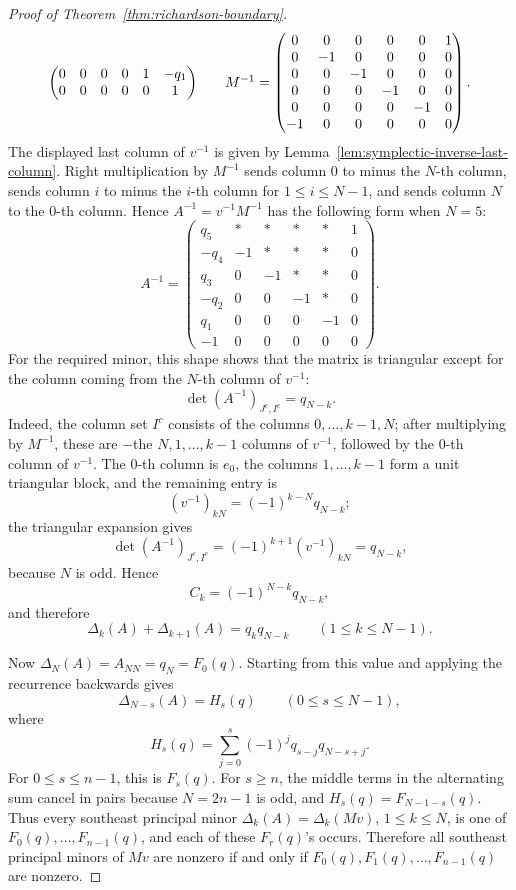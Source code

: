 \documentclass[10pt,a4paper]{amsart}
\begin{document}
\begin{proof}[Proof of Theorem~\ref{thm:richardson-boundary}]
\[\begin{array}{c@{\qquad}c}
\begin{pmatrix}
0&0&0&0&1&-q_1\\
0&0&0&0&0&1
\end{pmatrix}
&
M^{-1}=
\begin{pmatrix}
0&0&0&0&0&1\\
0&-1&0&0&0&0\\
0&0&-1&0&0&0\\
0&0&0&-1&0&0\\
0&0&0&0&-1&0\\
-1&0&0&0&0&0
\end{pmatrix}.
\end{array}
\]
The displayed last column of \(v^{-1}\) is given by Lemma~\ref{lem:symplectic-inverse-last-column}.
Right multiplication by \(M^{-1}\) sends column \(0\) to minus the \(N\)-th column, sends column \(i\) to minus the \(i\)-th column for \(1\le i\le N-1\), and sends column \(N\) to the \(0\)-th column. Hence \(A^{-1}=v^{-1}M^{-1}\) has the following form when \(N=5\):
\[
A^{-1}=
\begin{pmatrix}
q_5&*&*&*&*&1\\
-q_4&-1&*&*&*&0\\
q_3&0&-1&*&*&0\\
-q_2&0&0&-1&*&0\\
q_1&0&0&0&-1&0\\
-1&0&0&0&0&0
\end{pmatrix}.
\]
For the required minor, this shape shows that the matrix is triangular except for the column coming from the \(N\)-th column of \(v^{-1}\):
\[
\det(A^{-1})_{J^c,I^c}=q_{N-k}.
\]
Indeed, the column set \(I^c\) consists of the columns \(0,\ldots,k-1,N\); after multiplying by \(M^{-1}\), these are \(-\)the \(N,1,\ldots,k-1\) columns of \(v^{-1}\), followed by the \(0\)-th column of \(v^{-1}\). The \(0\)-th column is \(e_0\), the columns \(1,\ldots,k-1\) form a unit triangular block, and the remaining entry is
\[
(v^{-1})_{kN}=(-1)^{k-N}q_{N-k};
\]
the triangular expansion gives
\[
\det(A^{-1})_{J^c,I^c}
=(-1)^{k+1}(v^{-1})_{kN}
=q_{N-k},
\]
because \(N\) is odd. Hence
\[
C_k=(-1)^{N-k}q_{N-k},
\]
and therefore
\[
\Delta_k(A)+\Delta_{k+1}(A)=q_kq_{N-k}
\qquad(1\le k\le N-1).
\]

Now \(\Delta_N(A)=A_{NN}=q_N=F_0(q)\). Starting from this value and applying the recurrence backwards gives
\[
\Delta_{N-s}(A)=H_s(q)
\qquad(0\le s\le N-1),
\]
where
\[
H_s(q)=\sum_{j=0}^s(-1)^jq_{s-j}q_{N-s+j}.
\]
For \(0\le s\le n-1\), this is \(F_s(q)\). For \(s\ge n\), the middle terms in the alternating sum cancel in pairs because \(N=2n-1\) is odd, and \(H_s(q)=F_{N-1-s}(q)\). Thus every southeast principal minor \(\Delta_k(A)=\Delta_k(Mv)\), \(1\le k\le N\), is one of \(F_0(q),\ldots,F_{n-1}(q)\), and each of these \(F_r(q)\)'s occurs. Therefore all southeast principal minors of \(Mv\) are nonzero if and only if \(F_0(q),F_1(q),\ldots,F_{n-1}(q)\) are nonzero.


\end{proof}
\end{document}

